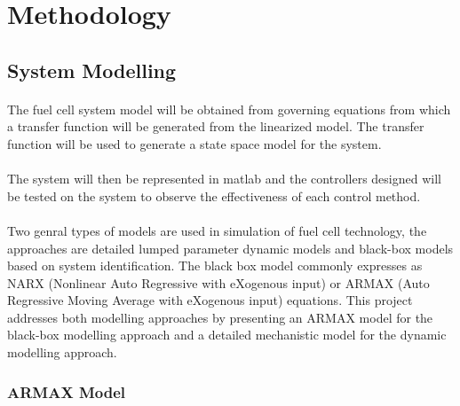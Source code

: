 \section{Methodology}
\subsection{System Modelling}
\paragraph{}The fuel cell system model will be obtained from governing equations from which a transfer function will be generated from the linearized model. The transfer function will be used to generate a state space model for the system. 
\paragraph{}The system will then be represented in matlab and the controllers designed will be tested on the system to observe the effectiveness of each control method. 
\paragraph{} Two genral types of models are used in simulation of fuel cell technology, the approaches are detailed lumped parameter dynamic models and black-box models based on system identification. The black box model commonly expresses as NARX (Nonlinear Auto Regressive with eXogenous input) or ARMAX (Auto Regressive Moving Average with eXogenous input) equations. This project addresses both modelling approaches by presenting an ARMAX model for the black-box modelling approach and a detailed mechanistic model for the dynamic modelling approach.
\subsubsection{ARMAX Model}
